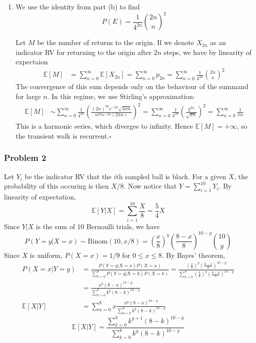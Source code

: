 \documentclass[letterpaper,12pt]{article}
\renewcommand*{\qed}{\hfill\ensuremath{\square}}
\newcommand*{\Binom}[2]{\text{Binom}\left(#1, #2\right)}
\newcommand*{\erv}[1]{\mathbb{E}\left[#1\right]}
\begin{document}
\begin{flushleft}
\begin{enumerate}[label=(\alph*)]
        \item
        We use the identity from part (b) to find
        $$P(E) = \frac{1}{4^{2n}}\binom{2n}{n}^2$$

        Let $M$ be the number of returns to the origin. If we denote $X_{2n}$ as an indicator RV for returning to the origin after $2n$ steps, we have by linearity of expectaion
        \begin{align*}
            \erv{M} &= \sum_{n=0}^\infty \erv{X_{2n}} = \sum_{n=0}^\infty p_{2n} = \sum_{n=0}^\infty \frac{1}{4^{2n}}\binom{2n}{n}^2
        \end{align*}
        The convergence of this sum depends only on the behaviour of the summand for large $n$. In this regime, we use Stirling's approximation:
        \begin{align*}
            \erv{M} &\sim \sum_{n=0}^\infty \frac{1}{4^{2n}} \left(\frac{(2n)^{2n} e^{-2n} \sqrt{4\pi n}}{n^{2n} e^{-2n} (2\pi n)}\right)^2 = \sum_{n=0}^\infty \frac{1}{4^{2n}} \left(\frac{2^{2n}}{\sqrt{\pi n}}\right)^2 = \sum_{n=0}^\infty \frac{1}{\pi n}
        \end{align*}
        This is a harmonic series, which diverges to infinity. Hence $\erv{M} = +\infty$, so the transient walk is recurrent.\qed

    \end{enumerate}

    \subsubsection*{Problem 2}
    Let $Y_i$ be the indicator RV that the $i$th sampled ball is black. For a given $X$, the probability of this occuring is then $X/8$. Now notice that $Y = \sum_{i=1}^10 Y_i$. By linearity of expectation,
    $$\boxed{\erv{Y | X} = \sum_{i=1}^{10} \frac{X}{8} = \frac{5}{4}X}$$
    Since $Y|X$ is the sum of 10 Bernoulli trials, we have
    $$P(Y = y|X = x) \sim \Binom{10}{x/8} = \left(\frac{x}{8}\right)^y \left(\frac{8 - x}{8}\right)^{10 - y} \binom{10}{y}$$
    Since $X$ is uniform, $P(X = x) = 1/9$ for $0 \leq x \leq 8$. By Bayes' theorem,
    \begin{align*}
        P(X = x | Y = y) &= \frac{P(Y = y|X = x)P(X = x)}{\sum_{k=0}^8 P(Y = y|X = k) P(X = k)} = \frac{\left(\frac{x}{8}\right)^y \left(\frac{8 - x}{8}\right)^{10 - y}}{\sum_{k=0}^8 \left(\frac{k}{8}\right)^y \left(\frac{8 - k}{8}\right)^{10 - y}} \\
        &= \frac{x^y (8 - x)^{10 - y}}{\sum_{k=0}^8 k^y (8 - k)^{10 - y}} \\
        \erv{X|Y} &= \sum_{x=0}^8 x\frac{x^y (8 - x)^{10 - y}}{\sum_{k=0}^8 k^y (8 - k)^{10 - y}}
    \end{align*}
    $$\boxed{\erv{X|Y} = \frac{\sum_{k=0}^8 k^{y+1} (8 - k)^{10 - y}}{\sum_{k=0}^8 k^y (8 - k)^{10 - y}}}$$


\end{flushleft}
\end{document}
